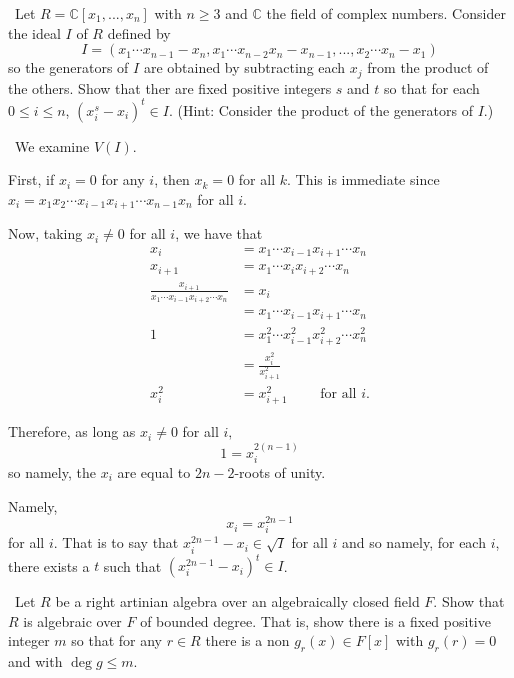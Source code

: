 \documentclass[12pt]{AlgebraQual}
\begin{document}
\begin{problem} $\,$
Let $R=\mathbb{C}[x_1,...,x_n]$ with $n\ge3$ and $\mathbb{C}$ the field of complex numbers. Consider the ideal $I$ of $R$ defined by $$I=(x_1\cdots x_{n-1}-x_n,x_1\cdots x_{n-2}x_n-x_{n-1},...,x_2\cdots x_n-x_1)$$ so the generators of $I$ are obtained by subtracting each $x_j$ from the product of the others. Show that ther are fixed positive integers $s$ and $t$ so that for each $0\le i\le n$, $(x_i^s-x_i)^t\in I$. (Hint: Consider the product of the generators of $I$.)
\end{problem}


\begin{solution}$\,$
We examine $V(I).$

First, if $x_i=0$ for any $i$, then $x_k=0$ for all $k$. This is immediate since $x_i=x_1x_2\cdots x_{i-1}x_{i+1}\cdots x_{n-1}x_n$ for all $i.$

Now, taking $x_i\not=0$ for all $i$, we have that \begin{align*}
    x_i&=x_1\cdots x_{i-1}x_{i+1}\cdots x_n\\
    x_{i+1}&=x_1\cdots x_ix_{i+2}\cdots x_n\\
    \frac{x_{i+1}}{x_1\cdots x_{i-1}x_{i+2}\cdots x_n}&=x_i\\
    &=x_1\cdots x_{i-1}x_{i+1}\cdots x_n\\
    1&=x_1^2\cdots x_{i-1}^2x_{i+2}^2\cdots x_n^2\\
    &=\frac{x_i^2}{x_{i+1}^2}\\
    x_i^2&=x_{i+1}^2\qquad\text{ for all }i.
\end{align*}

Therefore, as long as $x_i\not=0$ for all $i,$ $$1=x_i^{2(n-1)}$$ so namely, the $x_i$ are equal to $2n-2$-roots of unity.

Namely, $$x_i=x_i^{2n-1}$$ for all $i$. That is to say that $x_i^{2n-1}-x_i\in\sqrt{I}$ for all $i$ and so namely, for each $i$, there exists a $t$ such that $(x_i^{2n-1}-x_i)^t\in I$.
\end{solution}
\newpage

\begin{problem} $\,$
Let $R$ be a right artinian algebra over an algebraically closed field $F$. Show that $R$ is algebraic over $F$ of bounded degree. That is, show there is a fixed positive integer $m$ so that for any $r\in R$ there is a non $g_r(x)\in F[x]$ with $g_r(r)=0$ and with $\deg g\le m$.
\end{problem}
\end{document}
